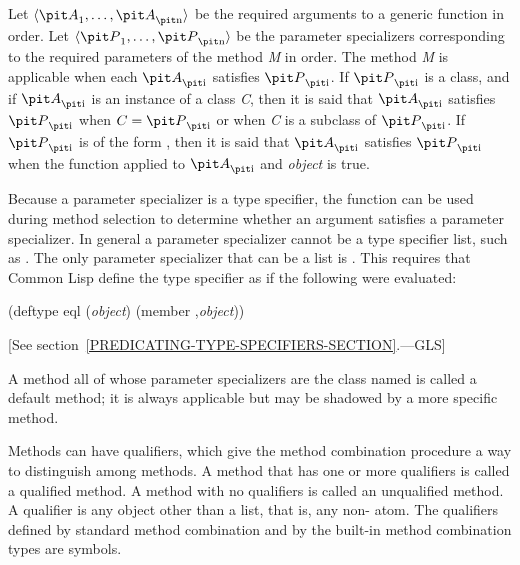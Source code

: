 Let $\langle {\it A}\sub 1, \ldots, {\it A}\sub {\hbox{\scriptsize\it n}}\rangle$ be the required
arguments to a generic function in order. Let $\langle {\it P}\sub 1,
\ldots, {\it P}\sub {\hbox{\scriptsize\it n}}\rangle$ be the parameter specializers corresponding to
the required parameters of the method {\it M} in order.  The method {\it M} is
{\bit applicable\/} when each ${\it A}\sub {\hbox{\scriptsize\it i}}$
{\bit satisfies\/} ${\it P}\sub {\hbox{\scriptsize\it i}}$.
If ${\it P}\sub {\hbox{\scriptsize\it i}}$ is a class,
and if ${\it A}\sub {\hbox{\scriptsize\it i}}$ is an instance of a class
{\it C}, then it is said that ${\it A}\sub {\hbox{\scriptsize\it i}}$ {\bit satisfies\/}
${\it P}\sub {\hbox{\scriptsize\it i}}$ when $C={\it P}\sub {\hbox{\scriptsize\it i}}$ or when {\it C} is a subclass of ${\it P}\sub {\hbox{\scriptsize\it i}}$.  If
${\it P}\sub {\hbox{\scriptsize\it i}}$ is of the form
, then it is said that
${\it A}\sub {\hbox{\scriptsize\it i}}$ satisfies ${\it P}\sub {\hbox{\scriptsize\it i}}$
when the function  applied to
${\it A}\sub {\hbox{\scriptsize\it i}}$ and {\it object} is true.

Because a parameter specializer is a type specifier, the function 
 can be used during method selection to determine whether an
argument satisfies a parameter specializer.  In general a
parameter specializer cannot be a type specifier list, such as 
.  The only parameter specializer that can
be a list is .  This requires that
Common Lisp define the type specifier 
as if the following were evaluated:

\begin{lisp}
(deftype eql ({\it object\/}) {\Xbq}(member ,{\it object\/}))
\end{lisp}
[See section~\ref{PREDICATING-TYPE-SPECIFIERS-SECTION}.---GLS]

A method all of whose parameter specializers are the class named 
 is called a {\bit default method}; it is always applicable but
may be shadowed by a more specific method.

Methods can have {\bit qualifiers}, which give the method combination
procedure a way to distinguish among methods.  A method that has one
or more qualifiers is called a {\bit qualified\/} method.
A method with no qualifiers is called an {\bit unqualified method}. 
A qualifier is any object other than a list, that is,
any non- atom.  The qualifiers defined by standard method combination
and by the built-in method combination types are symbols.

